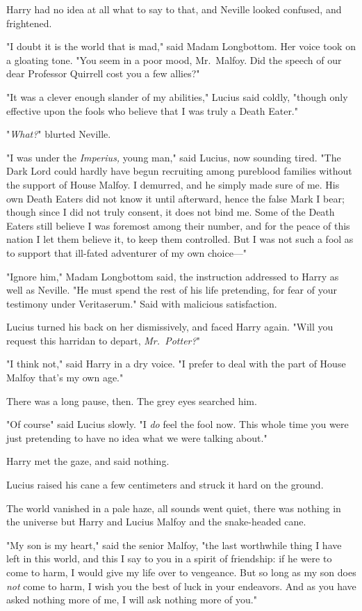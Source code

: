 Harry had no idea at all what to say to that, and Neville looked confused, and
frightened.

"I doubt it is the world that is mad," said Madam Longbottom. Her voice took on
a gloating tone. "You seem in a poor mood, Mr.~Malfoy. Did the speech of our
dear Professor Quirrell cost you a few allies?"

"It was a clever enough slander of my abilities," Lucius said coldly, "though
only effective upon the fools who believe that I was truly a Death Eater."

"\emph{What?}" blurted Neville.

"I was under the \emph{Imperius,} young man," said Lucius, now sounding tired.
"The Dark Lord could hardly have begun recruiting among pureblood families
without the support of House Malfoy. I demurred, and he simply made sure of me.
His own Death Eaters did not know it until afterward, hence the false Mark I
bear; though since I did not truly consent, it does not bind me. Some of the
Death Eaters still believe I was foremost among their number, and for the peace
of this nation I let them believe it, to keep them controlled. But I was not
such a fool as to support that ill-fated adventurer of my own choice---"

"Ignore him," Madam Longbottom said, the instruction addressed to Harry as well
as Neville. "He must spend the rest of his life pretending, for fear of your
testimony under Veritaserum." Said with malicious satisfaction.

Lucius turned his back on her dismissively, and faced Harry again. "Will you
request this harridan to depart, \emph{Mr.~Potter?}"

"I think not," said Harry in a dry voice. "I prefer to deal with the part of
House Malfoy that's my own age."

There was a long pause, then. The grey eyes searched him.

"Of course{\el}" said Lucius slowly. "I \emph{do} feel the fool now. This
whole time you were just pretending to have no idea what we were talking about."

Harry met the gaze, and said nothing.

Lucius raised his cane a few centimeters and struck it hard on the ground.

The world vanished in a pale haze, all sounds went quiet, there was nothing in
the universe but Harry and Lucius Malfoy and the snake-headed cane.

"My son is my heart," said the senior Malfoy, "the last worthwhile thing I have
left in this world, and this I say to you in a spirit of friendship: if he were
to come to harm, I would give my life over to vengeance. But so long as my son
does \emph{not} come to harm, I wish you the best of luck in your endeavors.
And as you have asked nothing more of me, I will ask nothing more of you."


